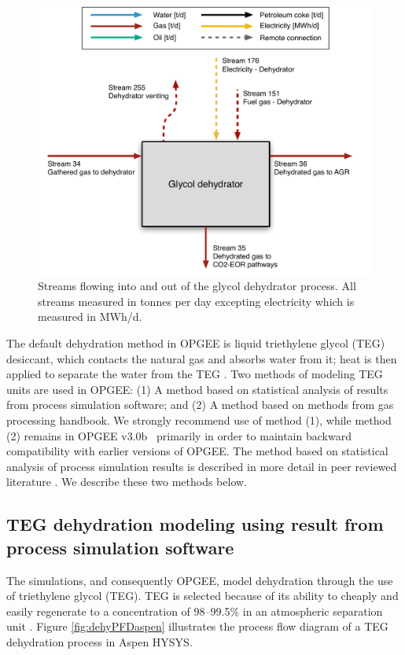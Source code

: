 \documentclass[11pt]{report}
\newcommand{\version}{v3.0b }
\begin{document}
\begin{figure}
\includegraphics[width=0.85\columnwidth]{images/Glycol_dehydrator_PF.pdf}
\caption{Streams flowing into and out of the glycol dehydrator process. All streams measured in tonnes per day excepting electricity which is measured in MWh/d.}
\label{fig:glycol_dehydrator_PF}
\end{figure}


The default dehydration method in OPGEE is liquid triethylene glycol (TEG) desiccant, which contacts the natural gas and absorbs water from it; heat is then applied to separate the water from the TEG \cite[p. 140]{Manning1991}. Two methods of modeling TEG units are used in OPGEE: (1) A method based on statistical analysis of results from process simulation software; and (2) A method based on methods from gas processing handbook. We strongly recommend use of method (1), while method (2) remains in OPGEE \version \, primarily in order to maintain backward compatibility with earlier versions of OPGEE.  The method based on statistical analysis of process simulation results is described in more detail in peer reviewed literature \cite{Masnadi2020}. We describe these two methods below.

\subsection{TEG dehydration modeling using result from process simulation software}

The simulations, and consequently OPGEE, model dehydration through the use of triethylene glycol (TEG). TEG is selected because of its ability to cheaply and easily regenerate to a concentration of 98--99.5\% in an atmospheric separation unit \cite{Manning1991}. Figure \ref{fig:dehyPFDaspen} illustrates the process flow diagram of a TEG dehydration process in Aspen HYSYS.
\end{document}
